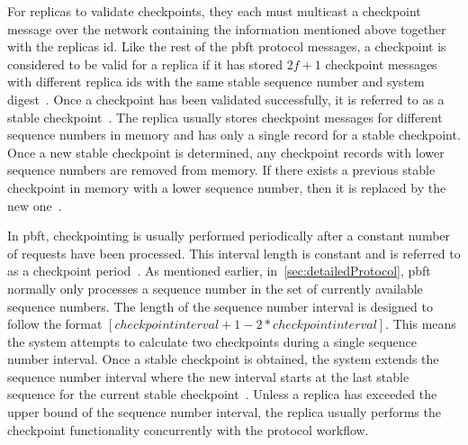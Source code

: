 For replicas to validate checkpoints, they each must multicast a checkpoint message over the network containing the information mentioned above together with the replicas id. Like the rest of the \ac{pbft} protocol messages, a checkpoint is considered to be valid for a replica if it has stored $2f+1$ checkpoint messages with different replica ids with the same stable sequence number and system digest~\cites[p.~261-262]{BOOK:BuildDepDistSyst}[p.~5]{PAPER:OGPBFT}[p.~410]{PAPER:PBFTRecovery}. Once a checkpoint has been validated successfully, it is referred to as a stable checkpoint~\cites[p.~3]{PAPER:DPBFT}[p.~261]{BOOK:BuildDepDistSyst}. The replica usually stores checkpoint messages for different sequence numbers in memory and has only a single record for a stable checkpoint. Once a new stable checkpoint is determined, any checkpoint records with lower sequence numbers are removed from memory. If there exists a previous stable checkpoint in memory with a lower sequence number, then it is replaced by the new one~\cite[p.~261-262]{BOOK:BuildDepDistSyst}.

In \ac{pbft}, checkpointing is usually performed periodically after a constant number of requests have been processed. This interval length is constant and is referred to as a checkpoint period~\cites[p.~261]{BOOK:BuildDepDistSyst}[p.~410]{PAPER:PBFTRecovery}. As mentioned earlier, in~\autoref{sec:detailedProtocol}, \ac{pbft} normally only processes a sequence number in the set of currently available sequence numbers. The length of the sequence number interval is designed to follow the format $[checkpointinterval+1-2*checkpointinterval]$. This means the system attempts to calculate two checkpoints during a single sequence number interval. Once a stable checkpoint is obtained, the system extends the sequence number interval where the new interval starts at the last stable sequence for the current stable checkpoint~\cites[p.~5]{PAPER:OGPBFT}[p.~410]{PAPER:PBFTRecovery}. Unless a replica has exceeded the upper bound of the sequence number interval, the replica usually performs the checkpoint functionality concurrently with the protocol workflow.

